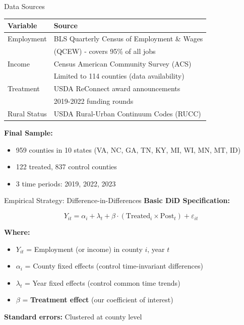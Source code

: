 \documentclass[aspectratio=169]{beamer}
\begin{document}
\begin{frame}{Data Sources}
\begin{table}
\small
\begin{tabular}{ll}
\toprule
\textbf{Variable} & \textbf{Source} \\
\midrule
Employment & BLS Quarterly Census of Employment \& Wages \\
 & (QCEW) - covers 95\% of all jobs \\
\addlinespace
Income & Census American Community Survey (ACS) \\
 & Limited to 114 counties (data availability) \\
\addlinespace
Treatment & USDA ReConnect award announcements \\
 & 2019-2022 funding rounds \\
\addlinespace
Rural Status & USDA Rural-Urban Continuum Codes (RUCC) \\
\bottomrule
\end{tabular}
\end{table}

\vspace{0.3cm}

\textbf{Final Sample:}
\begin{itemize}
    \item 959 counties in 10 states (VA, NC, GA, TN, KY, MI, WI, MN, MT, ID)
    \item 122 treated, 837 control counties
    \item 3 time periods: 2019, 2022, 2023
\end{itemize}
\end{frame}

\begin{frame}{Empirical Strategy: Difference-in-Differences}
\textbf{Basic DiD Specification:}

\begin{equation*}
Y_{it} = \alpha_i + \lambda_t + \beta \cdot (\text{Treated}_i \times \text{Post}_t) + \varepsilon_{it}
\end{equation*}



\vspace{0.3cm}

\textbf{Where:}
\begin{itemize}
    \item $Y_{it}$ = Employment (or income) in county $i$, year $t$
    \item $\alpha_i$ = County fixed effects (control time-invariant differences)
    \item $\lambda_t$ = Year fixed effects (control common time trends)
    \item $\beta$ = \textbf{Treatment effect} (our coefficient of interest)
\end{itemize}



\vspace{0.3cm}

\textbf{Standard errors:} Clustered at county level
\end{frame}
\end{document}
